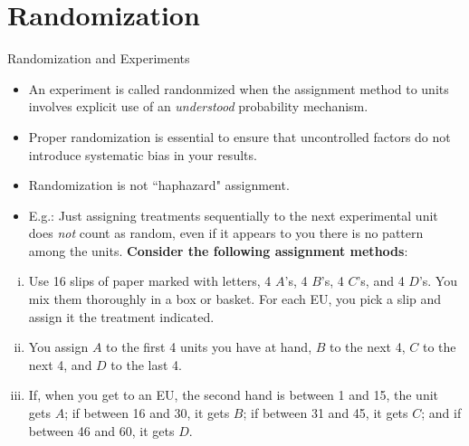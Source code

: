 \section{Randomization}

\begin{frame}[allowframebreaks]{Randomization and Experiments}
  
\begin{itemize}
  \item An experiment is called \alert{randonmized} when the assignment method to units involves explicit use of an \emph{understood} probability mechanism.
  \item Proper randomization is essential to ensure that uncontrolled factors do not introduce systematic bias in your results.
  \item \alert{Randomization is not ``haphazard" assignment}.
  \item E.g.: Just assigning treatments sequentially to the next experimental unit does \emph{not} count as random, even if it appears to you there is no pattern among the units. \textbf{Consider the following assignment methods}:
\end{itemize}
  
  
  \framebreak
  
  
  \begin{enumerate}[(i)]
    \item Use 16 slips of paper marked with letters, 4 $A$'s, 4 $B$'s, 4 $C$'s, and 4 $D$'s.
    You mix them thoroughly in a box or basket. 
    For each EU, you pick a slip and assign it the treatment indicated.
    
    \item You assign $A$ to the first 4 units you have at hand, $B$ to the next 4, $C$ to the next 4, and $D$ to the last 4.
    
    \item If, when you get to an EU, the second hand is between 1 and 15, the unit gets $A$; if between 16 and 30, it gets $B$; if between 31 and 45, it gets $C$; and if between 46 and 60, it gets $D$.
  \end{enumerate}
  
  
\end{frame}

